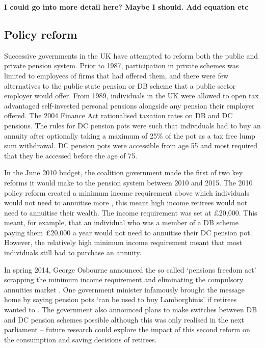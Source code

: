 \documentclass[12pt]{article}
\begin{document}
\textbf{I could go into more detail here? Maybe I should. Add equation etc}


\subsection{Policy reform}

Successive governments in the UK have attempted to reform both the public and
private pension system. Prior to 1987, participation in private schemes was
limited to employees of firms that had offered them, and there were few
alternatives to the public state pension or DB scheme that a public sector
employer would offer. From 1989, individuals in the UK were allowed to open tax
advantaged self-invested personal pensions alongside any pension their employer
offered. The 2004 Finance Act rationalised taxation rates on DB and DC pensions.
The rules for DC pension pots were such that individuals had to buy an annuity
after optionally taking a maximum of 25\% of the pot as a tax free lump sum
withdrawal. DC pension pots were accessible from age 55 and most required that
they be accessed before the age of 75.


In the June 2010 budget, the coalition government made the first of two key
reforms it would make to the pension system between 2010 and 2015. The 2010
policy reform created a minimum income requirement above which individuals would
not need to annuitise more \cite{finance_act_hmt_2011}, this meant high income
retirees would not need to annuitise their wealth. The income requirement was
set at £20,000. This meant, for example, that an individual who was a member of
a DB scheme paying them £20,000 a year would not need to annuitise their DC
pension pot. However, the relatively high minimum income requirement meant that
most individuals still had to purchase an annuity.

In spring 2014, George Osbourne announced the so called `pensions freedom act'
scrapping the minimum income requirement and eliminating the compulsory
annuities market \cite{pen_freedoms_hmt_2014}. One government minister
infamously brought the message home by saying pension pots `can be used to buy
Lamborghinis' if retirees wanted to \cite{guardian_lambos}. The government also
announced plans to make switches between DB and DC pension schemes possible
although this was only realised in the next parliament -- future research could
explore the impact of this second reform on the consumption and saving decisions
of retirees.
\end{document}
